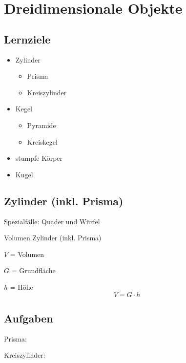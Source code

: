 \section{Dreidimensionale Objekte}


\subsection*{Lernziele}
\begin{itemize}
\item Zylinder
  \begin{itemize}
  \item Prisma
  \item Kreiszylinder
    \end{itemize}
\item Kegel
  \begin{itemize}
  \item Pyramide
  \item Kreiskegel
  \end{itemize}
  \item stumpfe Körper
  \item Kugel
\end{itemize}
\newpage

\subsection{Zylinder (inkl. Prisma)}
Spezialfälle: Quader und Würfel

\begin{gesetz}{Volumen Zylinder (inkl. Prisma)}{}
  
  $V$ = Volumen
  
  $G$ = Grundfläche

  $h$ = Höhe
  $$V = G\cdot{}h$$
  \end{gesetz}


\subsection*{Aufgaben}
Prisma:


Kreiszylinder:
\newpage

